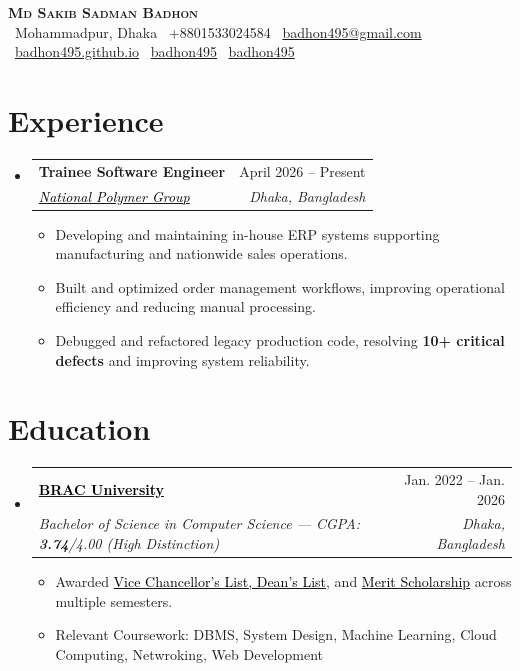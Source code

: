 \documentclass[a4paper]{article}
\makeatletter
\newcommand{\resumeItem}[1]{
  \item\small{
    {#1 \vspace{-2pt}}
  }
}
\newcommand{\resumeSubheading}[4]{
  \vspace{-2pt}\item
    \begin{tabular*}{0.97\textwidth}[t]{l@{\extracolsep{\fill}}r}
      \textbf{#1} & #2 \\
      \textit{\small#3} & \textit{\small #4} \\
    \end{tabular*}\vspace{-7pt}
}
\newcommand{\resumeSubHeadingListStart}{\begin{itemize}[leftmargin=0.15in, label={}]}
\newcommand{\resumeSubHeadingListEnd}{\end{itemize}}
\newcommand{\resumeItemListStart}{\begin{itemize}}
\newcommand{\resumeItemListEnd}{\end{itemize}\vspace{-5pt}}
\makeatother
\begin{document}
\begin{center}
    \textbf{\Huge \scshape Md Sakib Sadman Badhon} \\ \vspace{4pt}
    \small
    \faMapMarker*~Mohammadpur, Dhaka \enspace
    ~+8801533024584 \enspace
    \faEnvelope~\href{mailto:badhon495@gmail.com}{badhon495@gmail.com} \enspace
    \faGlobe~\href{https://badhon495.github.io/}{badhon495.github.io} \enspace
    \faLinkedin~\href{https://linkedin.com/in/badhon495/}{badhon495} \enspace
    \faGithub~\href{https://github.com/badhon495}{badhon495} \enspace
\end{center}




\section{Experience}
  \resumeSubHeadingListStart

    \resumeSubheading
      {Trainee Software Engineer}{April 2026 -- Present}
      {\href{https://www.nationalpolymer.net/}{\textcolor{black}{National Polymer Group}}}{Dhaka, Bangladesh}
      \resumeItemListStart
        \resumeItem{Developing and maintaining in-house ERP systems supporting manufacturing and nationwide sales operations.}
        \resumeItem{Built and optimized order management workflows, improving operational efficiency and reducing manual processing.}
        \resumeItem{Debugged and refactored legacy production code, resolving \textbf{10+ critical defects} and improving system reliability.}
      \resumeItemListEnd

  \resumeSubHeadingListEnd




\section{Education}
  \resumeSubHeadingListStart
    \resumeSubheading
      {\href{https://www.bracu.ac.bd/}{\textcolor{black}{BRAC University}}}{Jan. 2022 -- Jan. 2026}
      {Bachelor of Science in Computer Science --- CGPA: \textbf{3.74}/4.00 (High Distinction)}{Dhaka, Bangladesh}
      \resumeItemListStart
        \resumeItem{Awarded \href{https://www.bracu.ac.bd/academics/policies-and-procedures/academic-standings-and-honors}{\textcolor{black}{Vice Chancellor's List, Dean's List}}, and \href{https://www.bracu.ac.bd/admissions/international-applicants/scholarship-financial-aid}{\textcolor{black}{Merit Scholarship}} across multiple semesters.}
        \resumeItem{Relevant Coursework: DBMS, System Design, Machine Learning, Cloud Computing, Netwroking, Web Development}
      \resumeItemListEnd
  \resumeSubHeadingListEnd
\end{document}
